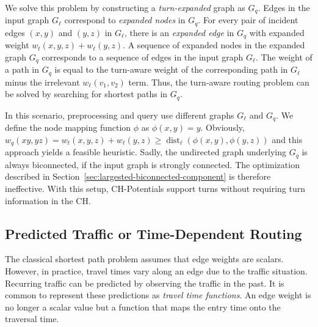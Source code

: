 \documentclass[a4paper,UKenglish,cleveref, autoref, thm-restate]{lipics-v2021}
\begin{document}
We solve this problem by constructing a \emph{turn-expanded} graph as $G_q$.
Edges in the input graph $G_\ell$ correspond to \emph{expanded nodes} in $G_q$.
For every pair of incident edges $(x,y)$ and $(y,z)$ in $G_\ell$, there is an \emph{expanded edge} in $G_q$ with expanded weight $w_t(x,y,z) + w_\ell(y,z)$.
A sequence of expanded nodes in the expanded graph $G_q$ corresponds to a sequence of edges in the input graph $G_\ell$.
The weight of a path in $G_q$ is equal to the turn-aware weight of the corresponding path in $G_\ell$ minus the irrelevant $w_\ell(v_1,v_2)$ term.
Thus, the turn-aware routing problem can be solved by searching for shortest paths in $G_q$.

In this scenario, preprocessing and query use different graphs $G_\ell$ and $G_q$.
We define the node mapping function $\phi$ as $\phi(x,y) = y$.
Obviously, $w_q(xy, yz) = w_t(x,y,z) + w_\ell(y,z) \geq \operatorname{dist}_\ell(\phi(x,y), \phi(y,z))$ and this approach yields a feasible heuristic.
Sadly, the undirected graph underlying $G_q$ is always biconnected, if the input graph is strongly connected.
The optimization described in Section~\ref{sec:largested-biconnected-component} is therefore ineffective.
With this setup, CH-Potentials support turns without requiring turn information in the CH.


\subsection{Predicted Traffic or Time-Dependent Routing}
\label{sec:predicted-traffic}

The classical shortest path problem assumes that edge weights are scalars.
However, in practice, travel times vary along an edge due to the traffic situation.
Recurring traffic can be predicted by observing the traffic in the past.
It is common \cite{bgsv-mtdtt-13,bdpw-dtdrp-16,swz-sfert-20} to represent these predictions as \emph{travel time functions}.
An edge weight is no longer a scalar value but a function that maps the entry time onto the traversal time.
\end{document}
